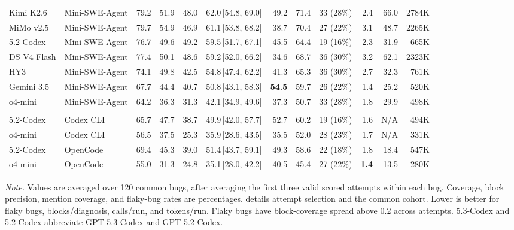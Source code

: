 \begin{table}[t]
{\begin{tabular}{@{}ll@{\hspace{6pt}}rrr>{\columncolor{evalmaincol}}r@{\hspace{6pt}}rr@{\hspace{6pt}}r@{\hspace{6pt}}rrr@{}}
    Kimi K2.6 & Mini-SWE-Agent & 79.2 & 51.9 & 48.0 & 62.0\,{\tiny[54.8, 69.0]} & 49.2 & 71.4 & 33 (28\%) & 2.4 & 66.0 & 2784K \\
    MiMo v2.5 & Mini-SWE-Agent & 79.7 & 54.9 & 46.9 & 61.1\,{\tiny[53.8, 68.2]} & 38.7 & 70.4 & 27 (22\%) & 3.1 & 48.7 & 2265K \\
    5.2-Codex & Mini-SWE-Agent & 76.7 & 49.6 & 49.2 & 59.5\,{\tiny[51.7, 67.1]} & 45.5 & 64.4 & 19 (16\%) & 2.3 & 31.9 & 665K \\
    DS V4 Flash & Mini-SWE-Agent & 77.4 & 50.1 & 48.6 & 59.2\,{\tiny[52.0, 66.2]} & 34.6 & 68.7 & 36 (30\%) & 3.2 & 62.1 & 2323K \\
    HY3 & Mini-SWE-Agent & 74.1 & 49.8 & 42.5 & 54.8\,{\tiny[47.4, 62.2]} & 41.3 & 65.3 & 36 (30\%) & 2.7 & 32.3 & 761K \\
    Gemini 3.5 & Mini-SWE-Agent & 67.7 & 44.4 & 40.7 & 50.8\,{\tiny[43.1, 58.3]} & \textbf{54.5} & 59.7 & 26 (22\%) & 1.4 & 25.2 & 520K \\
    o4-mini & Mini-SWE-Agent & 64.2 & 36.3 & 31.3 & 42.1\,{\tiny[34.9, 49.6]} & 37.3 & 50.7 & 33 (28\%) & 1.8 & 29.9 & 498K \\
    \addlinespace[0.25ex]
    \rowcolor{evalgroupbg}\multicolumn{12}{@{}l@{}}{\textit{Harness comparison}} \\
    5.2-Codex & Codex CLI & 65.7 & 47.7 & 38.7 & 49.9\,{\tiny[42.0, 57.7]} & 52.7 & 60.2 & 19 (16\%) & 1.6 & N/A & 494K \\
    o4-mini & Codex CLI & 56.5 & 37.5 & 25.3 & 35.9\,{\tiny[28.6, 43.5]} & 35.5 & 52.0 & 28 (23\%) & 1.7 & N/A & 331K \\
    5.2-Codex & OpenCode & 69.4 & 45.3 & 39.0 & 51.4\,{\tiny[43.7, 59.1]} & 49.3 & 58.6 & 22 (18\%) & 1.8 & 18.4 & 547K \\
    o4-mini & OpenCode & 55.0 & 31.3 & 24.8 & 35.1\,{\tiny[28.0, 42.2]} & 40.5 & 45.4 & 27 (22\%) & \textbf{1.4} & 13.5 & 280K \\
    \bottomrule
  \end{tabular}
  }
  \vspace{0.02in}
  \begin{minipage}{0.98\textwidth}
  \footnotesize\emph{Note.} Values are averaged over 120 common bugs, after averaging the first three valid scored attempts within each bug. Coverage, block precision, mention coverage, and flaky-bug rates are percentages.  details attempt selection and the common cohort. Lower is better for flaky bugs, blocks/diagnosis, calls/run, and tokens/run. Flaky bugs have block-coverage spread above 0.2 across attempts. 5.3-Codex and 5.2-Codex abbreviate GPT-5.3-Codex and GPT-5.2-Codex.
  \end{minipage}
\end{table}
